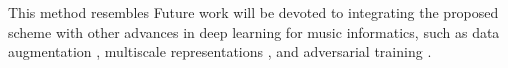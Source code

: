 \documentclass{article}
\begin{document}
This method resembles \cite{Dieleman2011} \cite{Durand2016}
Future work will be devoted to integrating the proposed scheme with other advances
in deep learning for music informatics, such as data augmentation \cite{McFee2015-muda},
multiscale representations \cite{Hamel2012, Anden2015},
and adversarial training \cite{Kereliuk2015}.

\clearpage

\end{document}
